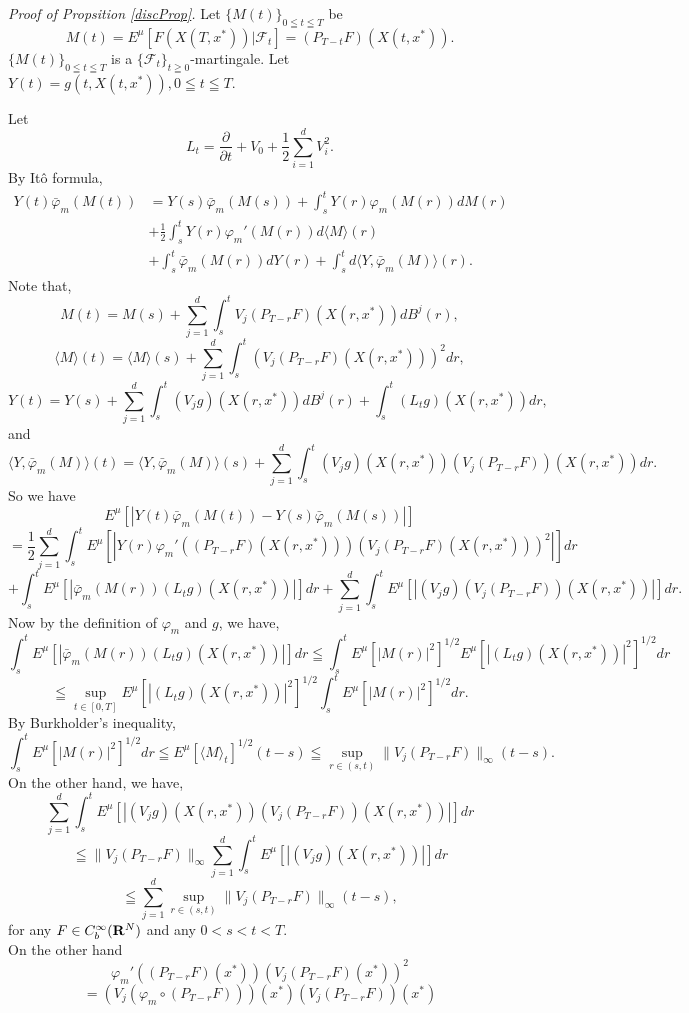 \documentclass[12pt]{article}
\begin{document}
{\it Proof of Propsition \ref{discProp}.}
Let $\{M(t)\}_{0\leqq t \leqq T}$ be
$$M(t) = E^{\mu}[F(X(T,x^*))|\mathcal{F}_t]=(P_{T-t}F)(X(t,x^*)).$$
$\{M(t)\}_{0\leqq t \leqq T}$ is a $\{\mathcal{F}_t\}_{t\geqq 0}$-martingale.
Let $Y(t)=g(t,X(t,x^*)), 0 \leqq t \leqq T.$

Let 
$$L_t = \frac{\partial}{\partial t} + V_0+\frac{1}{2}\sum_{i=1}^d V_i^2.$$
By It\^o formula, 
\begin{align*}
Y(t)\bar{\varphi}_m(M(t))&=Y(s)\bar{\varphi}_m(M(s))+\int_s^t Y(r)\varphi_m(M(r))dM(r)\\
&+\frac{1}{2}\int_s^t Y(r)\varphi_m'(M(r))d\langle M \rangle(r)\\
&+\int_s^t \bar{\varphi}_m(M(r))dY(r)+\int_s^t d\langle Y, \bar{\varphi}_m(M) \rangle(r).
\end{align*}
Note that,
$$M(t)=M(s) + \sum_{j=1}^d \int_s^t V_j (P_{T-r}F)(X(r,x^*))dB^j(r),$$
$$\langle M \rangle(t)=\langle M \rangle(s) + \sum_{j=1}^d \int_s^t(V_j (P_{T-r}F)(X(r,x^*)))^2dr,$$
$$Y(t)=Y(s) + \sum_{j=1}^d \int_s^t  (V_jg)(X(r,x^*)) dB^j(r) +\int_s^t (L_t g)(X(r,x^*))dr,$$
and
$$\langle Y, \bar{\varphi}_m(M) \rangle(t)=\langle Y, \bar{\varphi}_m(M) \rangle(s) + \sum_{j=1}^d \int_s^t (V_jg)(X(r,x^*))(V_j (P_{T-r}F))(X(r,x^*))dr.$$
So we have
$$E^{\mu}[|Y(t)\bar{\varphi}_m(M(t)) - Y(s)\bar{\varphi}_m(M(s))|]$$
$$=\frac{1}{2}\sum_{j=1}^d \int_s^t E^{\mu}[|Y(r)\varphi_m'( (P_{T-r}F)(X(r,x^*)) ) \left(V_j (P_{T-r}F)(X(r,x^*))\right)^2|] dr$$
$$+\int_s^t E^{\mu}[|\bar{\varphi}_m(M(r)) (L_t g)(X(r,x^*))|]dr+ \sum_{j=1}^d \int_s^t E^{\mu}[|(V_jg)(V_j (P_{T-r}F))(X(r,x^*))|]dr.$$
Now by the definition of $\varphi_m$ and $g$,  we have,
$$\int_s^t E^{\mu}[|\bar{\varphi}_m(M(r)) (L_t g)(X(r,x^*))|]dr \leqq \int_s^t  E^{\mu}[|M(r)|^2]^{1/2}E^{\mu}[|(L_t g)(X(r,x^*))|^2]^{1/2}dr$$
$$ \leqq \sup_{t\in[0,T]}E^{\mu}[|(L_t g)(X(r,x^*))|^2]^{1/2} \int_s^t  E^{\mu}[|M(r)|^2]^{1/2}dr.$$
By Burkholder's inequality,
$$\int_s^t  E^{\mu}[|M(r)|^2]^{1/2}dr \leqq E^{\mu}[\langle M \rangle_t]^{1/2} (t-s)
 \leqq \sup_{r\in (s,t)} \|V_j (P_{T-r}F)\|_{\infty}(t-s).$$
 On the other hand, we have,
$$\sum_{j=1}^d \int_s^t E^{\mu}[|(V_jg)(X(r,x^*))(V_j (P_{T-r}F))(X(r,x^*))|]dr$$
$$ \leqq \|V_j (P_{T-r}F)\|_{\infty} \sum_{j=1}^d \int_s^t E^{\mu}[|(V_jg)(X(r,x^*))|]dr$$
$$\leqq \sum_{j=1}^d \sup_{r\in (s,t)} \|V_j (P_{T-r}F)\|_{\infty} (t-s),$$
for any $ F \in C_b^{\infty}({\bf R}^{N})$ and any $0< s < t< T$.\\ 
On the other hand
$$ \varphi_m' \left( (P_{T-r}F)(x^*) \right) \left(V_j (P_{T-r}F)(x^*)\right)^2$$
$$=\left(V_j (\varphi_m \circ (P_{T-r}F))\right) (x^*) \left(V_j (P_{T-r}F)\right)(x^*) $$
\end{document}
